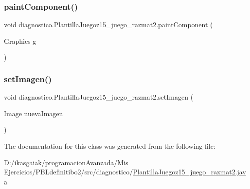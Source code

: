 \subsubsection{\texorpdfstring{paint\+Component()}{paintComponent()}}
{\footnotesize\ttfamily void diagnostico.\+Plantilla\+Juegoz15\+\_\+juego\+\_\+razmat2.\+paint\+Component (\begin{DoxyParamCaption}\item[{Graphics}]{g }\end{DoxyParamCaption})\hspace{0.3cm}{\ttfamily [protected]}}

\mbox{\label{classdiagnostico_1_1_plantilla_juegoz15__juego__razmat2_a90ca39e482ba78e25c8c26da59776221}} 
\subsubsection{\texorpdfstring{set\+Imagen()}{setImagen()}}
{\footnotesize\ttfamily void diagnostico.\+Plantilla\+Juegoz15\+\_\+juego\+\_\+razmat2.\+set\+Imagen (\begin{DoxyParamCaption}\item[{Image}]{nueva\+Imagen }\end{DoxyParamCaption})}



The documentation for this class was generated from the following file\+:\begin{DoxyCompactItemize}
\item 
D\+:/ikasgaiak/programacion\+Avanzada/\+Mis Ejercicios/\+P\+B\+Ldefinitibo2/src/diagnostico/\mbox{\hyperlink{_plantilla_juegoz15__juego__razmat2_8java}{Plantilla\+Juegoz15\+\_\+juego\+\_\+razmat2.\+java}}\end{DoxyCompactItemize}
